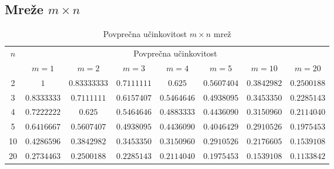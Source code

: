\documentclass[a4paper, 16pt]{article}
\begin{document}
    \subsection{Mreže $m \times n$}
    

    \begin{table}[!h]
        \begin{tabular}{c|c|c|c|c|c|c|c}
            \multirow{2}{*}{$n$} & 
            \multicolumn{7}{c}{Povprečna učinkovitost}\\
               & $m=1$       & $m=2$           & $m=3$           & $m=4$         & $m = 5$     & $m = 10$    & $m=20$     \\ \hline
            2  & $1$         & $0.83333333$ & $0.7111111$ & $0.625$       & $0.5607404$ & $0.3842982$ & $0.2500188$\\
            3  & $0.8333333$ & $0.7111111$  & $0.6157407$ & $0.5464646$   & $0.4938095$ & $0.3453350$ & $0.2285143$\\
            4  & $0.7222222$ & $0.625$      & $0.5464646$ & $0.4883333$   & $0.4436090$ & $0.3150960$ & $0.2114040$\\
            5  & $0.6416667$ & $0.5607407$  & $0.4938095$ & $0.4436090$   & $0.4046429$ & $0.2910526$ & $0.1975453$\\
            10 & $0.4286596$ & $0.3842982$  & $0.3453350$ & $0.3150960$   & $0.2910526$ & $0.2176605$ & $0.1539108$\\
            20 & $0.2734463$ & $0.2500188$  & $0.2285143$ & $0.2114040$   & $0.1975453$ & $0.1539108$ & $0.1133842$\\

        \end{tabular}
        \caption{Povprečna učinkovitost $m \times n$ mrež}
        \label{table: 1}
    \end{table}
\end{document}
